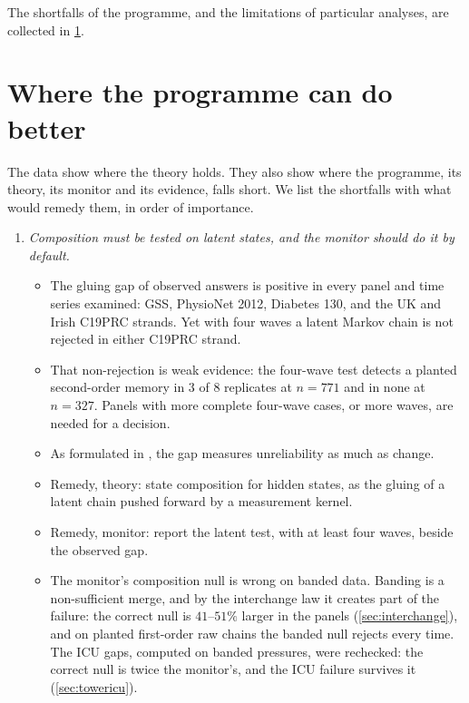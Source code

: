 \documentclass[11pt]{article}
\theoremstyle{definition}
\theoremstyle{remark}
\begin{document}
The shortfalls of the programme, and the limitations of particular analyses, are collected in \cref{sec:better}.

\section{Where the programme can do better}\label{sec:better}

The data show where the theory holds. They also show where the programme, its theory, its monitor and its evidence, falls short. We list
the shortfalls with what would remedy them, in order of importance.

\begin{enumerate}[leftmargin=*]
\item \emph{Composition must be tested on latent states, and the monitor should do it by default.}
  \begin{itemize}[nosep]
  \item The gluing gap of observed answers is positive in every panel and time series examined: GSS, PhysioNet 2012, Diabetes 130, and the
    UK and Irish C19PRC strands. Yet with four waves a latent Markov chain is not rejected in either C19PRC strand.
  \item That non-rejection is weak evidence: the four-wave test detects a planted second-order memory in $3$ of $8$ replicates at
    $n=771$ and in none at $n=327$. Panels with more complete four-wave cases, or more waves, are needed for a decision.
  \item As formulated in \cite[Prop.~4.8]{Bands}, the gap measures unreliability as much as change.
  \item Remedy, theory: state composition for hidden states, as the gluing of a latent chain pushed forward by a measurement kernel.
  \item Remedy, monitor: report the latent test, with at least four waves, beside the observed gap.
  \item The monitor's composition null is wrong on banded data. Banding is a non-sufficient merge, and by the interchange law it creates
    part of the failure: the correct null is $41$--$51\%$ larger in the panels (\cref{sec:interchange}), and on planted first-order raw
    chains the banded null rejects every time. The ICU gaps, computed on banded pressures, were rechecked: the correct null is twice the monitor's, and the ICU failure survives it (\cref{sec:towericu}).

\end{itemize}
\end{enumerate}
\end{document}
